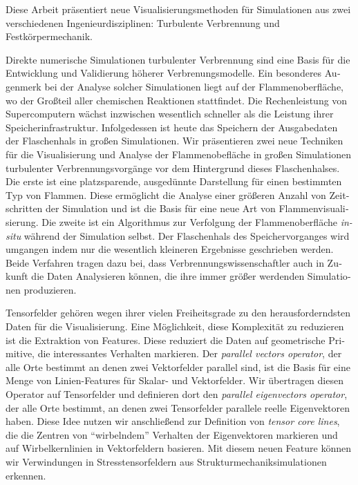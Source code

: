 \begin{otherlanguage}{german}%
%
Diese Arbeit pr\"asentiert neue Visualisierungsmethoden f\"ur Simulationen aus
zwei verschiedenen Ingenieurdisziplinen: Turbulente Verbrennung und
Festk\"orpermechanik.
%

%
Direkte numerische Simulationen turbulenter Verbrennung sind eine Basis f\"ur
die Entwicklung und Validierung h\"oherer Verbrenungsmodelle.
%
Ein besonderes Augenmerk bei der Analyse solcher Simulationen liegt auf der
Flammenoberfl\"ache, wo der Gro\ss{}teil aller chemischen Reaktionen
stattfindet.
%
Die Rechenleistung von Supercomputern w\"achst inzwischen wesentlich schneller
als die Leistung ihrer Speicherinfrastruktur.
%
Infolgedessen ist heute das Speichern der Ausgabedaten der Flaschenhals in
gro\ss{}en Simulationen.
%
Wir pr\"asentieren zwei neue Techniken f\"ur die Visualisierung und Analyse der
Flammenobefl\"ache in gro\ss{}en Simulationen turbulenter Verbrennungsvorg\"ange
vor dem Hintergrund dieses Flaschenhalses.
%
Die erste ist eine platzsparende, ausged\"unnte Darstellung f\"ur einen
bestimmten Typ von Flammen.
%
Diese erm\"oglicht die Analyse einer gr\"o\ss{}eren Anzahl von Zeitschritten der
Simulation und ist die Basis f\"ur eine neue Art von Flammenvisualisierung.
%
Die zweite ist ein Algorithmus zur Verfolgung der Flammenoberfl\"ache
\emph{in-situ} w\"ahrend der Simulation selbst.
%
Der Flaschenhals des Speichervorganges wird umgangen indem nur die wesentlich
kleineren Ergebnisse geschrieben werden.
%
Beide Verfahren tragen dazu bei, dass Verbrennungswissenschaftler auch in
Zukunft die Daten Analysieren k\"onnen, die ihre immer gr\"o\ss{}er werdenden
Simulationen produzieren.
%

%
Tensorfelder geh\"oren wegen ihrer vielen Freiheitsgrade zu den
herausforderndsten Daten f\"ur die Visualisierung.
%
Eine M\"oglichkeit, diese Komplexit\"at zu reduzieren ist die Extraktion von
Features.
%
Diese reduziert die Daten auf geometrische Primitive, die interessantes
Verhalten markieren.
%
Der \emph{parallel vectors operator}, der alle Orte bestimmt an denen zwei
Vektorfelder parallel sind, ist die Basis f\"ur eine Menge von Linien-Features
f\"ur Skalar- und Vektorfelder.
%
Wir übertragen diesen Operator auf Tensorfelder und definieren dort den
\emph{parallel eigenvectors operator}, der alle Orte bestimmt, an denen zwei
Tensorfelder parallele reelle Eigenvektoren haben.
%
Diese Idee nutzen wir anschlie\ss{}end zur Definition von \emph{tensor core
lines}, die die Zentren von ``wirbelndem'' Verhalten der Eigenvektoren markieren
und auf Wirbelkernlinien in Vektorfeldern basieren.
%
Mit diesem neuen Feature k\"onnen wir Verwindungen in Stresstensorfeldern aus
Strukturmechaniksimulationen erkennen.
%
\end{otherlanguage}%